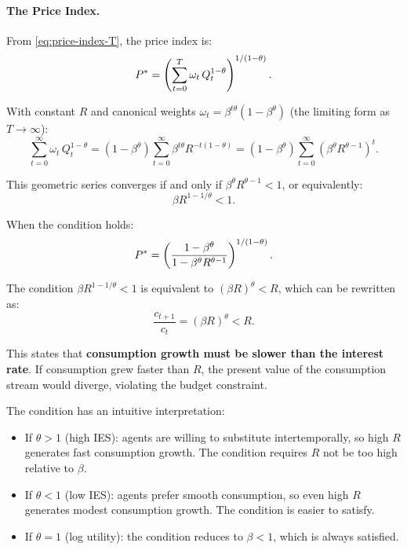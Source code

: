 \paragraph{The Price Index.}
From \cref{eq:price-index-T}, the price index is:
\begin{equation}
P^{*} = \left( \sum_{t=0}^{T} \omega_t \, Q_t^{1-\theta} \right)^{1/(1-\theta)}.
\label{eq:price-index-T-recall}
\end{equation}

With constant $R$ and canonical weights $\omega_t = \beta^{t\theta}(1 - \beta^\theta)$ (the limiting form as $T \to \infty$):
\begin{equation}
\sum_{t=0}^{\infty} \omega_t \, Q_t^{1-\theta} = (1 - \beta^\theta) \sum_{t=0}^{\infty} \beta^{t\theta} R^{-t(1-\theta)} = (1 - \beta^\theta) \sum_{t=0}^{\infty} \left( \beta^\theta R^{\theta - 1} \right)^t.
\label{eq:price-index-sum}
\end{equation}

This geometric series converges if and only if $\beta^\theta R^{\theta - 1} < 1$, or equivalently:
\begin{equation}
\beta R^{1 - 1/\theta} < 1.
\label{eq:convergence-condition}
\end{equation}

When the condition holds:
\begin{equation}
P^{*} = \left( \frac{1 - \beta^\theta}{1 - \beta^\theta R^{\theta - 1}} \right)^{1/(1-\theta)}.
\label{eq:price-index-infinity}
\end{equation}

\begin{calloutimportant}
The condition $\beta R^{1 - 1/\theta} < 1$ is equivalent to $(\beta R)^\theta < R$, which can be rewritten as:
\begin{equation}
\frac{c_{t+1}}{c_t} = (\beta R)^\theta < R.
\label{eq:growth-vs-return}
\end{equation}

This states that \textbf{consumption growth must be slower than the interest rate}. If consumption grew faster than $R$, the present value of the consumption stream would diverge, violating the budget constraint.

The condition has an intuitive interpretation:
\begin{itemize}[nosep]
\item If $\theta > 1$ (high IES): agents are willing to substitute intertemporally, so high $R$ generates fast consumption growth. The condition requires $R$ not be too high relative to $\beta$.
\item If $\theta < 1$ (low IES): agents prefer smooth consumption, so even high $R$ generates modest consumption growth. The condition is easier to satisfy.
\item If $\theta = 1$ (log utility): the condition reduces to $\beta < 1$, which is always satisfied.
\end{itemize}
\end{calloutimportant}

